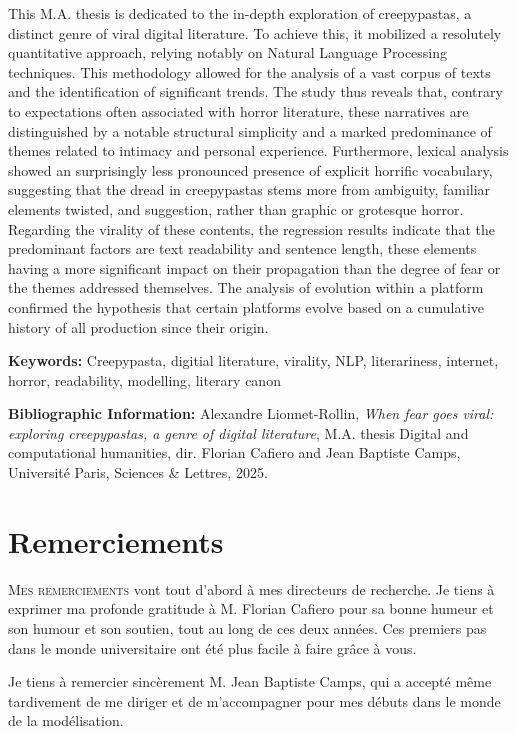 \documentclass[12pt,a4paper,oneside,titlepage]{book} %
\begin{document}
This M.A. thesis is dedicated to the in-depth exploration of creepypastas, a distinct genre of viral digital literature. To achieve this, it mobilized a resolutely quantitative approach, relying notably on Natural Language Processing techniques. This methodology allowed for the analysis of a vast corpus of texts and the identification of significant trends. The study thus reveals that, contrary to expectations often associated with horror literature, these narratives are distinguished by a notable structural simplicity and a marked predominance of themes related to intimacy and personal experience. Furthermore, lexical analysis showed an surprisingly less pronounced presence of explicit horrific vocabulary, suggesting that the dread in creepypastas stems more from ambiguity, familiar elements twisted, and suggestion, rather than graphic or grotesque horror. Regarding the virality of these contents, the regression results indicate that the predominant factors are text readability and sentence length, these elements having a more significant impact on their propagation than the degree of fear or the themes addressed themselves. The analysis of evolution within a platform confirmed the hypothesis that certain platforms evolve based on a cumulative history of all production since their origin.

\medskip

\textbf{Keywords:} Creepypasta, digitial literature, virality, NLP, literariness, internet, horror, readability, modelling, literary canon

\textbf{Bibliographic Information:} Alexandre Lionnet-Rollin, \textit{When fear goes viral: exploring creepypastas, a genre of digital literature}, M.A. thesis \og Digital and computational humanities\fg{}, dir. Florian Cafiero and Jean Baptiste Camps, Université Paris, Sciences \& Lettres, 2025.


\clearpage
\thispagestyle{empty}
\cleardoublepage


\section*{Remerciements}

\lettrine{M}{es remerciements} vont tout d'abord à mes directeurs de recherche. Je tiens à exprimer ma profonde gratitude à M. Florian Cafiero pour sa bonne humeur et son humour et son soutien, tout au long de ces deux années. Ces premiers pas dans le monde universitaire ont été plus facile à faire grâce à vous.

Je tiens à remercier sincèrement M. Jean Baptiste Camps, qui a accepté même tardivement de me diriger et de m'accompagner pour mes débuts dans le monde de la modélisation.
\end{document}

